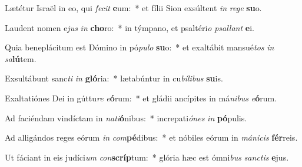 \item Lætétur Israël in eo, qui \textit{fe}\textit{cit} \textbf{e}um:~* et fílii Sion exsúltent \textit{in} \textit{re}\textit{ge} \textbf{su}o.
\item Laudent nomen e\textit{jus} \textit{in} \textbf{cho}ro:~* in týmpano, et psaltéri\textit{o} \textit{psal}\textit{lant} \textbf{e}i.
\item Quia beneplácitum est Dómino in pó\textit{pu}\textit{lo} \textbf{su}o:~* et exaltábit mansué\textit{tos} \textit{in} \textit{sa}\textbf{lú}tem.
\item Exsultábunt sanc\textit{ti} \textit{in} \textbf{gló}ria:~* lætabúntur in cu\textit{bí}\textit{li}\textit{bus} \textbf{su}is.
\item Exaltatiónes Dei in gúttu\textit{re} \textit{e}\textbf{ó}rum:~* et gládii ancípites in má\textit{ni}\textit{bus} \textit{e}\textbf{ó}rum.
\item Ad faciéndam vindíctam in \textit{na}\textit{ti}\textbf{ó}nibus:~* increpati\textit{ó}\textit{nes} \textit{in} \textbf{pó}pulis.
\item Ad alligándos reges eórum \textit{in} \textit{com}\textbf{pé}dibus:~* et nóbiles eórum in \textit{má}\textit{ni}\textit{cis} \textbf{fér}reis.
\item Ut fáciant in eis judíci\textit{um} \textit{con}\textbf{scríp}tum:~* glória hæc est ómni\textit{bus} \textit{sanc}\textit{tis} \textbf{e}jus.
